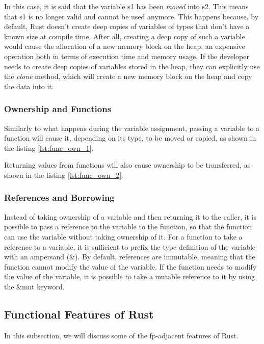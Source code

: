In this case, it is said that the variable s1 has been \textit{moved} into s2. This means that s1 is no longer valid and cannot be used anymore.
This happens because, by default, Rust doesn't create deep copies of variables of types that don't have a known size at compile time. After all, creating a deep copy of such
a variable would cause the allocation of a new memory block on the heap, an expensive operation both in terms of execution time and memory usage. If the developer
needs to create deep copies of variables stored in the heap, they can explicitly use the \textit{clone} method, which will create a new memory block on the heap and copy the data into it.

\subsubsection{Ownership and Functions}
Similarly to what happens during the variable assignment, passing a variable to a function will cause it, depending on its type, to be moved or copied, as shown in the listing \ref{lst:func_own_1}.



Returning values from functions will also cause ownership to be transferred, as shown in the listing \ref{lst:func_own_2}.



\subsubsection{References and Borrowing}
Instead of taking ownership of a variable and then returning it to the caller, it is possible to pass a reference to the variable to the function, so that the function can use the variable without taking ownership of it.
For a function to take a reference to a variable, it is sufficient to prefix the type definition of the variable with an ampersand (\&).
By default, references are immutable, meaning that the function cannot modify the value of the variable. If the function needs to modify the value of the variable, it is possible to take a mutable reference to it by using the \&mut keyword.

\subsection{Functional Features of Rust}
In this subsection, we will discuss some of the \ac{fp}-adjacent features of Rust.

